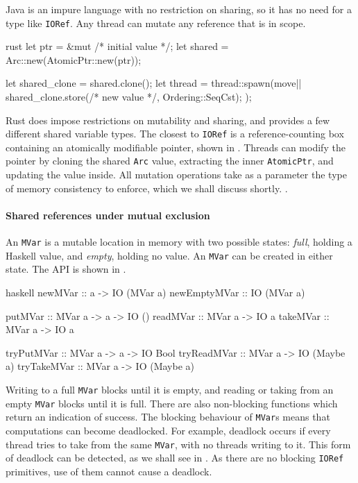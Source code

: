 Java is an impure language with no restriction on sharing, so it has
no need for a type like \verb|IORef|.  Any thread can mutate any
reference that is in scope.

\begin{listing}
\centering
\begin{cminted}{rust}
let ptr = &mut /* initial value */;
let shared = Arc::new(AtomicPtr::new(ptr));

let shared_clone = shared.clone();
let thread = thread::spawn(move|| {
    shared_clone.store(/* new value */, Ordering::SeqCst);
});
\end{cminted}
\caption{Shared mutable references in Rust.}\label{lst:smref_rust}
\end{listing}

Rust does impose restrictions on mutability and sharing, and provides
a few different shared variable types.  The closest to \verb|IORef| is
a reference-counting box containing an atomically modifiable pointer,
shown in .  Threads can modify the pointer by
cloning the shared \verb|Arc| value, extracting the inner
\verb|AtomicPtr|, and updating the value inside.  All mutation
operations take as a parameter the type of memory consistency to
enforce, which we shall discuss shortly. \label{page:rust_mem}.

\paragraph{Shared references under mutual exclusion}
An \verb|MVar| is a mutable location in memory with two possible
states: \emph{full}, holding a Haskell value, and \emph{empty},
holding no value.  An \verb|MVar| can be created in either state.  The
API is shown in .

\begin{listing}
\centering
\begin{cminted}{haskell}
newMVar      :: a -> IO (MVar a)
newEmptyMVar :: IO (MVar a)

putMVar      :: MVar a -> a -> IO ()
readMVar     :: MVar a -> IO a
takeMVar     :: MVar a -> IO a

tryPutMVar   :: MVar a -> a -> IO Bool
tryReadMVar  :: MVar a -> IO (Maybe a)
tryTakeMVar  :: MVar a -> IO (Maybe a)
\end{cminted}
\caption{Mutual exclusion in Haskell.}\label{lst:mute_haskell}
\end{listing}

Writing to a full \verb|MVar| blocks until it is empty, and reading or
taking from an empty \verb|MVar| blocks until it is full.  There are
also non-blocking functions which return an indication of success.
The blocking behaviour of \verb|MVar|s means that computations can
become deadlocked.  For example, deadlock occurs if every thread tries
to take from the same \verb|MVar|, with no threads writing to it.
This form of deadlock can be detected, as we shall see in
.  As there are no blocking \verb|IORef| primitives,
use of them cannot cause a deadlock.

